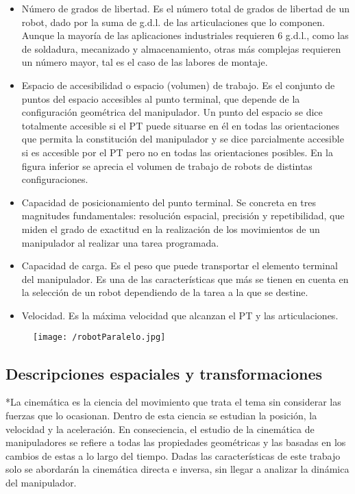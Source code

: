 \documentclass[a4paper, openright, 12pt]{report}
\begin{document}
	\begin{itemize}
		\item{Número de grados de libertad. Es el número total de grados de libertad de un robot, dado por la suma de g.d.l. de las articulaciones que lo componen. Aunque la mayoría de las aplicaciones industriales requieren 6 g.d.l., como las de soldadura, mecanizado y almacenamiento, otras más complejas requieren un número mayor, tal es el caso de las labores de montaje.}

		\item{Espacio de accesibilidad o espacio (volumen) de trabajo. Es el conjunto de puntos del espacio accesibles al punto terminal, que depende de la configuración geométrica del manipulador. Un punto del espacio se dice totalmente accesible si el PT puede situarse en él en todas las orientaciones que permita la constitución del manipulador y se dice parcialmente accesible si es accesible por el PT pero no en todas las orientaciones posibles. En la figura inferior se aprecia el volumen de trabajo de robots de distintas configuraciones.}

		\item{Capacidad de posicionamiento del punto terminal. Se concreta en tres magnitudes fundamentales: resolución espacial, precisión y repetibilidad, que miden el grado de exactitud en la realización de los movimientos de un manipulador al realizar una tarea programada.}

		\item{Capacidad de carga. Es el peso que puede transportar el elemento terminal del manipulador. Es una de las características que más se tienen en cuenta en la selección de un robot dependiendo de la tarea a la que se destine.}

		\item{Velocidad. Es la máxima velocidad que alcanzan el PT y las articulaciones.}
	\end{itemize}

		\begin{figure}[htb]
			\begin{center}
			\texttt{[image: /robotParalelo.jpg]}
			\end{center}
		\end{figure}


		\subsection{Descripciones espaciales y transformaciones}
			*La cinemática es la ciencia del movimiento que trata el tema sin considerar las fuerzas que lo ocasionan. Dentro de esta ciencia se estudian la posición, la velocidad y la aceleración. En conseciencia, el estudio de la cinemática de manipuladores se refiere a todas las propiedades geométricas y las basadas en los cambios de estas a lo largo del tiempo. Dadas las características de este trabajo solo se abordarán la cinemática directa e inversa, sin llegar a analizar la dinámica del manipulador.\\
\end{document}
